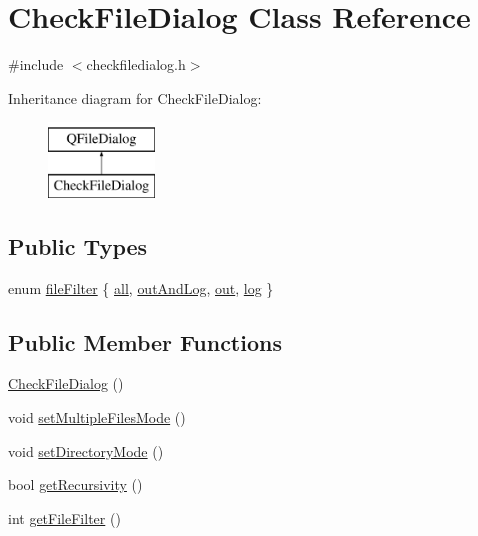 \hypertarget{class_check_file_dialog}{}\section{Check\+File\+Dialog Class Reference}
\label{class_check_file_dialog}


{\ttfamily \#include $<$checkfiledialog.\+h$>$}

Inheritance diagram for Check\+File\+Dialog\+:\begin{figure}[H]
\begin{center}
\leavevmode
\includegraphics[height=2.000000cm]{class_check_file_dialog}
\end{center}
\end{figure}
\subsection*{Public Types}
\begin{DoxyCompactItemize}
\item 
enum \hyperlink{class_check_file_dialog_aef425279166ddf0cec2e153d80893e80}{file\+Filter} \{ \hyperlink{class_check_file_dialog_aef425279166ddf0cec2e153d80893e80a422bcf31fdb409430f93a05d2384321e}{all}, 
\hyperlink{class_check_file_dialog_aef425279166ddf0cec2e153d80893e80a89aef0892b65192e684d3ea6a6e824f4}{out\+And\+Log}, 
\hyperlink{class_check_file_dialog_aef425279166ddf0cec2e153d80893e80ac75e4d0b89211bb2effd4e1c87275247}{out}, 
\hyperlink{class_check_file_dialog_aef425279166ddf0cec2e153d80893e80a875d4434eae42b0410509ba327d3933e}{log}
 \}
\end{DoxyCompactItemize}
\subsection*{Public Member Functions}
\begin{DoxyCompactItemize}
\item 
\hyperlink{class_check_file_dialog_a85e17297502cb15ef71df1cf747f6454}{Check\+File\+Dialog} ()
\item 
void \hyperlink{class_check_file_dialog_a658bf64019f6bb361e5e5d043e457c4a}{set\+Multiple\+Files\+Mode} ()
\item 
void \hyperlink{class_check_file_dialog_a4e32af3b8b068ec4e5b8f8005239e90b}{set\+Directory\+Mode} ()
\item 
bool \hyperlink{class_check_file_dialog_a8129e12b60b491d22467e50258af4e38}{get\+Recursivity} ()
\item 
int \hyperlink{class_check_file_dialog_aae56141a35759268fe0143386d3258d9}{get\+File\+Filter} ()
\end{DoxyCompactItemize}


